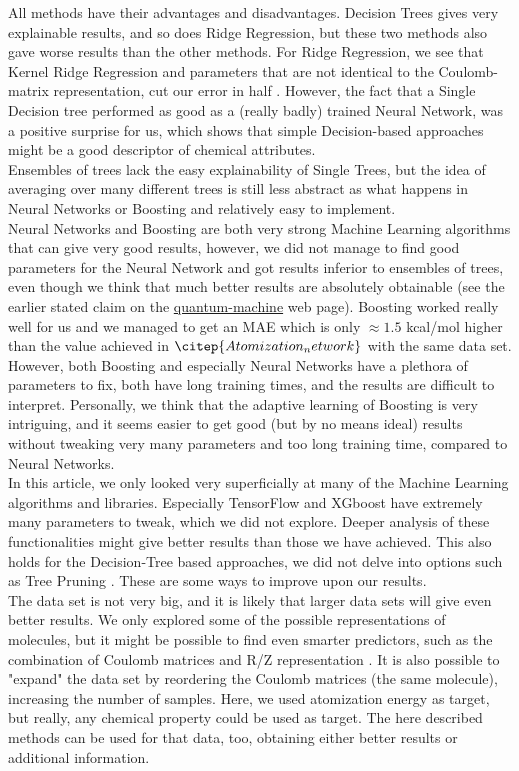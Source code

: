 \documentclass[11pt,a4paper,notitlepage]{article}
\begin{document}
All methods have their advantages and disadvantages. Decision Trees gives very explainable results, and so does Ridge Regression, but these two methods also gave worse results than the other methods. For Ridge Regression, we see that Kernel Ridge Regression and parameters that are not identical to the Coulomb-matrix representation, cut our error in half \citep{Atomization_Ridge}. However, the fact that a Single Decision tree performed as good as a (really badly) trained Neural Network, was a positive surprise for us, which shows that simple Decision-based approaches might be a good descriptor of chemical attributes. \\Ensembles of trees lack the easy explainability of Single Trees, but the idea of averaging over many different trees is still less abstract as what happens in Neural Networks or Boosting and relatively easy to implement. \\ Neural Networks and Boosting are both very strong Machine Learning algorithms that can give very good results, however, we did not manage to find good parameters for the Neural Network and got results inferior to ensembles of trees, even though we think that much better results are absolutely obtainable (see the earlier stated claim on the \href{http://quantum-machine.org/datasets/}{quantum-machine} web page). Boosting worked really well for us and we managed to get an MAE which is only $\approx1.5$ kcal/mol higher than the value achieved in $\citep{Atomization_network}$ with the same data set. However, both Boosting and especially Neural Networks have a plethora of parameters to fix, both have long training times, and the results are difficult to interpret. Personally, we think that the adaptive learning of Boosting is very intriguing, and it seems easier to get good (but by no means ideal) results without tweaking very many parameters and too long training time, compared to Neural Networks.\\

In this article, we only looked very superficially at many of the Machine Learning algorithms and libraries. Especially TensorFlow and XGboost have extremely many parameters to tweak, which we did not explore. Deeper analysis of these functionalities might give better results than those we have achieved. This also holds for the  Decision-Tree based approaches, we did not delve into options such as Tree Pruning \citep{MortenLectureNotes}. These are some ways to improve upon our results. \\
The data set is not very big, and it is likely that larger data sets will give even better results. We only explored some of the possible representations of molecules, but it might be possible to find even smarter predictors, such as the combination of Coulomb matrices and R/Z representation \citep{Atomization_network}. It is also possible to "expand" the data set by reordering the Coulomb matrices (the same molecule), increasing the number of samples. Here, we used atomization energy as target, but really, any chemical property could be used as target. The here described methods can be used for that data, too, obtaining either better results or additional information. 
\end{document}
